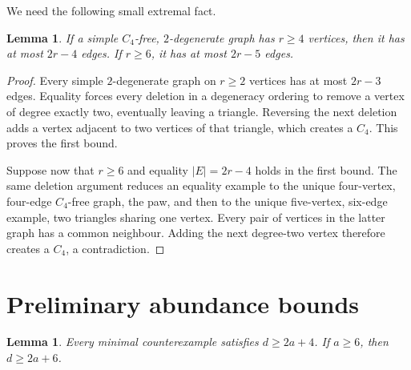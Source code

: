 \documentclass[11pt]{article}
\newtheorem{lemma}[theorem]{Lemma}
\begin{document}
We need the following small extremal fact.

\begin{lemma}\label{lem:edges}
If a simple $C_4$-free, $2$-degenerate graph has $r\ge4$ vertices, then it
has at most $2r-4$ edges.  If $r\ge6$, it has at most $2r-5$ edges.
\end{lemma}

\begin{proof}
Every simple $2$-degenerate graph on $r\ge2$ vertices has at most $2r-3$
edges.  Equality forces every deletion in a degeneracy ordering to remove a
vertex of degree exactly two, eventually leaving a triangle.  Reversing the
next deletion adds a vertex adjacent to two vertices of that triangle, which
creates a $C_4$.  This proves the first bound.

Suppose now that $r\ge6$ and equality $|E|=2r-4$ holds in the first bound.
The same deletion argument reduces an equality example to the unique
four-vertex, four-edge $C_4$-free graph, the paw, and then to the unique
five-vertex, six-edge example, two triangles sharing one vertex.  Every pair
of vertices in the latter graph has a common neighbour.  Adding the next
degree-two vertex therefore creates a $C_4$, a contradiction.
\end{proof}

\section{Preliminary abundance bounds}

\begin{lemma}\label{lem:preliminary}
Every minimal counterexample satisfies $d\ge2a+4$.  If $a\ge6$, then
$d\ge2a+6$.
\end{lemma}
\end{document}
